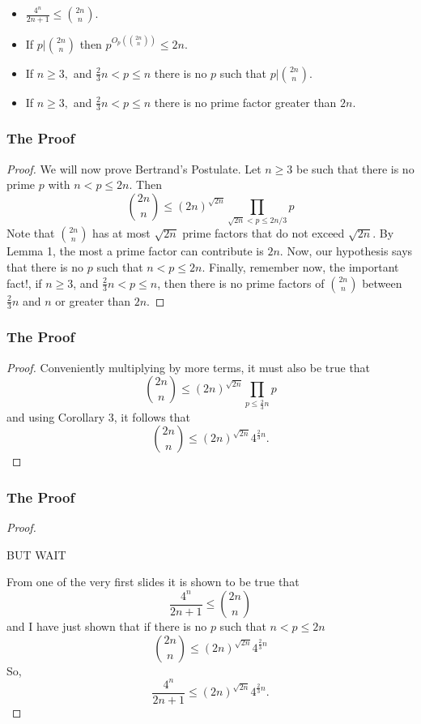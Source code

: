 \documentclass{beamer}
\begin{document}
\begin{frame}
\pause
\begin{itemize}[<+->]
\item $\frac{4^n}{2n + 1} \leq {2n\choose n}$.
\item If $p|{2n\choose n}$ then $p^{O_p({2n\choose n})} \leq 2n.$
\item If $n \geq 3,$ and $\frac{2}{3}n < p \leq n$ there is no $p$ such that $p | {2n\choose n}$.
\item If $n \geq 3,$ and $\frac{2}{3}n < p \leq n$ there is no prime factor greater than $2n$.
\end{itemize}
\end{frame}

\begin{frame}
\frametitle{The Proof}
\begin{proof}\renewcommand{\qedsymbol}{}
We will now prove Bertrand's Postulate.
Let $n \geq 3$ be such that there is no prime $p$ with $n < p \leq 2n$. Then \pause
$$ {2n \choose n} \leq (2n)^{\sqrt{2n}} \prod_{\sqrt{2n} < p \leq 2n/3}p$$\pause
Note that ${2n \choose n}$ has at most $\sqrt{2n}$ prime factors that do not exceed $\sqrt{2n}.$ By Lemma 1, the most a prime factor can contribute is $2n$. Now, our hypothesis says that there is no $p$ such that $n < p \leq 2n$. Finally, remember now, the important fact!, if $n \geq 3$, and $\frac{2}{3}n < p \leq n$, then there is no prime factors of ${2n \choose n}$ between $\frac{2}{3}n$ and $n$ or greater than $2n$.
\end{proof}
\end{frame}

\begin{frame}
\frametitle{The Proof}\renewcommand{\qedsymbol}{}
\begin{proof}
Conveniently multiplying by more terms, it must also be true that
$${2n \choose n } \leq (2n)^{\sqrt{2n}} \prod_{p\leq \frac{2}{3}n}p $$
\pause
and using Corollary 3, it follows that
$${2n \choose n} \leq (2n)^{\sqrt{2n}} 4^{\frac{2}{3}n}.$$
\end{proof}
\end{frame}

\begin{frame}
\frametitle{The Proof}\renewcommand{\qedsymbol}{}
\begin{proof}
\begin{center} BUT WAIT  \end{center}\pause
From one of the very first slides it is shown to be true that 
$$\frac{4^n}{2n + 1} \leq {2n \choose n} $$
\pause
and I have just shown that if there is no $p$ such that $n < p \leq 2n$
$${2n \choose n} \leq (2n)^{\sqrt{2n}}4^{\frac{2}{3}n} $$
\pause
So,
$$\frac{4^n}{2n+1} \leq (2n)^{\sqrt{2n}}4^{\frac{2}{3}n}.$$
\end{proof}
\end{frame}
\end{document}
